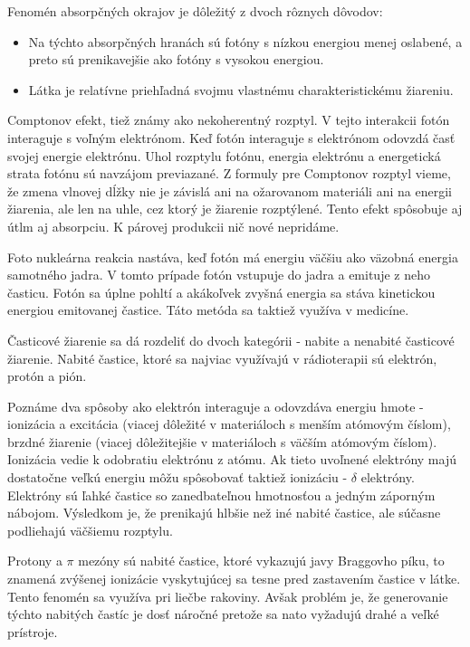 \documentclass[../../main.tex]{subfiles}
\begin{document}
Fenomén absorpčných okrajov je dôležitý z dvoch rôznych dôvodov:
\begin{itemize}
\item Na týchto absorpčných hranách sú fotóny s nízkou energiou menej oslabené, a preto sú prenikavejšie ako fotóny s vysokou energiou.
\item Látka je relatívne priehľadná svojmu vlastnému charakteristickému žiareniu.
\end{itemize}

Comptonov efekt, tiež známy ako nekoherentný rozptyl. V tejto interakcii fotón interaguje s voľným elektrónom. 
Keď fotón interaguje s elektrónom odovzdá časť svojej energie elektrónu. Uhol rozptylu fotónu, energia elektrónu a energetická strata fotónu sú navzájom previazané. Z formuly pre Comptonov rozptyl vieme, že zmena vlnovej dĺžky nie je závislá ani na ožarovanom materiáli ani na energii žiarenia, ale len na uhle, cez ktorý je žiarenie rozptýlené. Tento efekt spôsobuje aj útlm aj absorpciu. K párovej produkcii nič nové nepridáme. 

Foto nukleárna reakcia nastáva, keď fotón má energiu väčšiu ako väzobná energia samotného jadra. V tomto prípade fotón vstupuje do jadra a emituje z neho časticu. Fotón sa úplne pohltí a akákoľvek zvyšná energia sa stáva kinetickou energiou emitovanej častice. Táto metóda sa taktiež využíva v medicíne.

Časticové žiarenie sa dá rozdeliť do dvoch kategórii - nabite a nenabité časticové žiarenie. Nabité častice, ktoré sa najviac využívajú v rádioterapii sú elektrón, protón a pión.

Poznáme dva spôsoby ako elektrón interaguje a odovzdáva energiu hmote - ionizácia a excitácia (viacej dôležité v materiáloch s menším atómovým číslom), brzdné žiarenie (viacej dôležitejšie v materiáloch s väčším atómovým číslom). Ionizácia vedie k odobratiu elektrónu z atómu. Ak tieto uvoľnené elektróny majú dostatočne veľkú energiu môžu spôsobovať taktiež ionizáciu - $\delta$ elektróny. Elektróny sú ľahké častice so zanedbateľnou hmotnosťou a jedným záporným nábojom. Výsledkom je, že prenikajú hlbšie než iné nabité častice, ale súčasne podliehajú väčšiemu rozptylu.

Protony a $\pi$ mezóny sú nabité častice, ktoré vykazujú javy Braggovho píku, to znamená zvýšenej ionizácie vyskytujúcej sa tesne pred zastavením častice v látke. Tento fenomén sa využíva pri liečbe rakoviny. Avšak problém je, že generovanie týchto nabitých častíc je dosť náročné pretože sa nato vyžadujú drahé a veľké prístroje.
\end{document}
